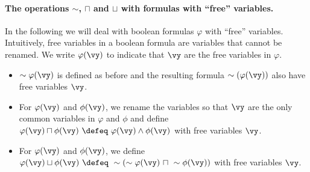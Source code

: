 \documentclass[11pt, a4paper]{article}
\begin{document}
\paragraph*{The operations $\sim$, $\sqcap$ and $\sqcup$ with formulas with ``free'' variables.}
In the following we will deal with boolean formulas $\varphi$ with ``free'' variables.
Intuitively, free variables in a boolean formula are variables that cannot be renamed.
We write $\varphi(\vy)$ to indicate that $\vy$ are the free variables in $\varphi$.
\begin{itemize}
\item
$\sim \varphi(\vy)$ is defined as before
and the resulting formula $\sim(\varphi(\vy))$ also have free variables $\vy$.
\item
For $\varphi(\vy)$ and $\phi(\vy)$, we rename the variables 
so that $\vy$ are the only common variables in $\varphi$ and $\phi$
and define $\varphi(\vy)\sqcap\phi(\vy) \ \defeq \ \varphi(\vy)\wedge\phi(\vy)$
with free variables $\vy$.
\item
For $\varphi(\vy)$ and $\phi(\vy)$,
we define $\varphi(\vy)\sqcup\phi(\vy) \ \defeq \ \sim(\sim\varphi(\vy) \ \sqcap \ \sim\phi(\vy))$
with free variables $\vy$.
\end{itemize}
\end{document}
